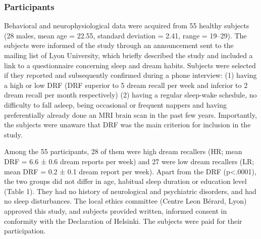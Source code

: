 \subsubsection*{Participants}
Behavioral and neurophysiological data were acquired from 55 healthy subjects (28 males, mean age = 22.55, standard deviation = 2.41, range = 19–29). The subjects were informed of the study through an announcement sent to the mailing list of Lyon University, which briefly described the study and included a link to a questionnaire concerning sleep and dream habits. Subjects were selected if they reported and subsequently confirmed during a phone interview: (1) having a high or low DRF (DRF superior to 5 dream recall per week and inferior to 2 dream recall per month respectively) (2) having a regular sleep-wake schedule, no difficulty to fall asleep, being occasional or frequent nappers and having preferentially already done an MRI brain scan in the past few years. Importantly, the subjects were unaware that DRF was the main criterion for inclusion in the study.

Among the 55 participants, 28 of them were high dream recallers (HR; mean DRF = 6.6 ± 0.6 dream reports per week) and 27 were low dream recallers (LR; mean DRF = 0.2 ± 0.1 dream report per week). Apart from the DRF (p<.0001), the two groups did not differ in age, habitual sleep duration or education level (Table 1). They had no history of neurological and psychiatric disorders, and had no sleep disturbances. The local ethics committee (Centre Leon Bérard, Lyon) approved this study, and subjects provided written, informed consent in conformity with the Declaration of Helsinki. The subjects were paid for their participation.

